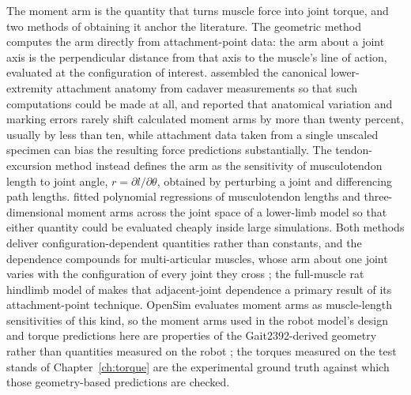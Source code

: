The moment arm is the quantity that turns muscle force into joint torque, and two methods of obtaining it anchor the literature. The geometric method computes the arm directly from attachment-point data: the arm about a joint axis is the perpendicular distance from that axis to the muscle's line of action, evaluated at the configuration of interest. \citet{brand_model_1982} assembled the canonical lower-extremity attachment anatomy from cadaver measurements so that such computations could be made at all, and reported that anatomical variation and marking errors rarely shift calculated moment arms by more than twenty percent, usually by less than ten, while attachment data taken from a single unscaled specimen can bias the resulting force predictions substantially. The tendon-excursion method instead defines the arm as the sensitivity of musculotendon length to joint angle, $r = \partial l/\partial\theta$, obtained by perturbing a joint and differencing path lengths. \citet{menegaldo_moment_2004} fitted polynomial regressions of musculotendon lengths and three-dimensional moment arms across the joint space of a lower-limb model so that either quantity could be evaluated cheaply inside large simulations. Both methods deliver configuration-dependent quantities rather than constants, and the dependence compounds for multi-articular muscles, whose arm about one joint varies with the configuration of every joint they cross \citep{zajac_determining_1989}; the full-muscle rat hindlimb model of \citet{young_analyzing_2019} makes that adjacent-joint dependence a primary result of its attachment-point technique. OpenSim evaluates moment arms as muscle-length sensitivities of this kind, so the moment arms used in the robot model's design and torque predictions here are properties of the Gait2392-derived geometry rather than quantities measured on the robot \citep{delp_opensim_2007, seth_opensim_2018}; the torques measured on the test stands of Chapter~\ref{ch:torque} are the experimental ground truth against which those geometry-based predictions are checked.

